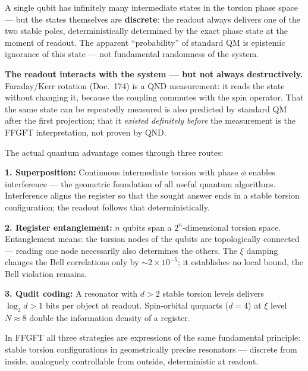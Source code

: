 \begin{conclusionBox}
A single qubit has infinitely many intermediate states
in the torsion phase space --- but the states themselves are
\textbf{discrete}: the readout always delivers one of the
two stable poles, deterministically determined by the
exact phase state at the moment of readout.
The apparent ``probability'' of standard QM
is epistemic ignorance of this state ---
not fundamental randomness of the system.

\textbf{The readout interacts with the system ---
but not always destructively.}
Faraday/Kerr rotation (Doc.~174) is a
QND measurement: it reads the state without changing it,
because the coupling commutes with the spin operator.
That the same state can be repeatedly measured
is also predicted by standard QM after the first projection;
that it \emph{existed definitely before} the measurement
is the FFGFT interpretation, not proven by QND.

The actual quantum advantage comes through three routes:

\textbf{1. Superposition:}
Continuous intermediate torsion with phase $\phi$
enables interference --- the geometric foundation
of all useful quantum algorithms.
Interference aligns the register so that
the sought answer ends in a stable torsion configuration;
the readout follows that deterministically.

\textbf{2. Register entanglement:}
$n$ qubits span a $2^n$-dimensional torsion space.
Entanglement means: the torsion nodes of the qubits
are topologically connected --- reading one
node necessarily also determines the others.
The $\xi$ damping changes the Bell correlations only by
$\sim 2\times10^{-5}$; it establishes no local bound,
the Bell violation remains.

\textbf{3. Qudit coding:}
A resonator with $d > 2$ stable torsion levels
delivers $\log_2 d > 1$ bits per object at readout.
Spin-orbital ququarts ($d = 4$) at
$\xi$ level $N \approx 8$ double the
information density of a register.

In FFGFT all three strategies are expressions of the same
fundamental principle: stable torsion configurations
in geometrically precise resonators --- discrete from inside,
analoguely controllable from outside, deterministic at readout.
\end{conclusionBox}


